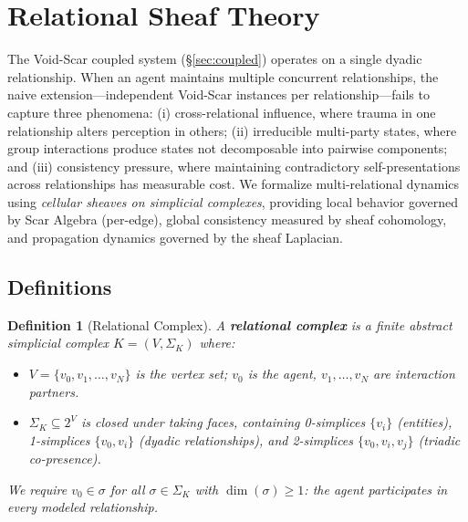 \documentclass[11pt]{article}
\newtheorem{definition}[theorem]{Definition}
\begin{document}
\section{Relational Sheaf Theory}
\label{sec:sheaf}

The Void-Scar coupled system (\S\ref{sec:coupled}) operates on a single dyadic relationship. When an agent maintains multiple concurrent relationships, the naive extension---independent Void-Scar instances per relationship---fails to capture three phenomena: (i) cross-relational influence, where trauma in one relationship alters perception in others; (ii) irreducible multi-party states, where group interactions produce states not decomposable into pairwise components; and (iii) consistency pressure, where maintaining contradictory self-presentations across relationships has measurable cost. We formalize multi-relational dynamics using \emph{cellular sheaves on simplicial complexes}, providing local behavior governed by Scar Algebra (per-edge), global consistency measured by sheaf cohomology, and propagation dynamics governed by the sheaf Laplacian.

\subsection{Definitions}

\begin{definition}[Relational Complex]
\label{def:relational-complex}
A \textbf{relational complex} is a finite abstract simplicial complex $K = (V, \Sigma_K)$ where:
\begin{itemize}
\item $V = \{v_0, v_1, \ldots, v_N\}$ is the vertex set; $v_0$ is the agent, $v_1, \ldots, v_N$ are interaction partners.
\item $\Sigma_K \subseteq 2^V$ is closed under taking faces, containing 0-simplices $\{v_i\}$ (entities), 1-simplices $\{v_0, v_i\}$ (dyadic relationships), and 2-simplices $\{v_0, v_i, v_j\}$ (triadic co-presence).
\end{itemize}
We require $v_0 \in \sigma$ for all $\sigma \in \Sigma_K$ with $\dim(\sigma) \geq 1$: the agent participates in every modeled relationship.
\end{definition}
\end{document}
